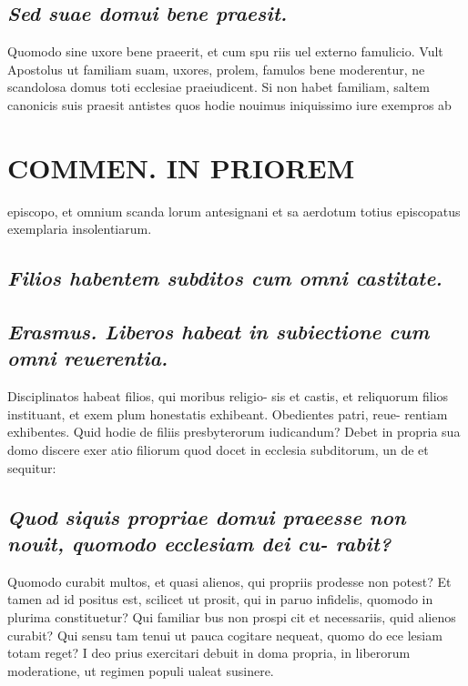\documentclass{article}
\begin{document}
\begin{pages}
\subsection*{\textit{Sed suae domui bene praesit. }}\pstart Quomodo sine uxore bene praeerit, et cum spu riis uel externo famulicio. Vult Apostolus ut familiam suam, uxores, prolem, famulos bene moderentur, ne scandolosa domus toti ecclesiae praeiudicent. Si non habet familiam, saltem canonicis suis praesit antistes quos hodie nouimus iniquissimo iure exempros ab  \pend
\section*{COMMEN. IN PRIOREM }
\marginpar{[ p.78 ]}\pstart episcopo, et omnium scanda lorum antesignani et sa aerdotum totius episcopatus exemplaria insolentiarum.  \pend
{}
{}
\subsection*{\textit{Filios habentem subditos cum omni castitate. }}
{}
\subsection*{\textit{Erasmus. Liberos habeat in subiectione cum omni reuerentia. }}\pstart Disciplinatos habeat filios, qui moribus religio- sis et castis, et reliquorum filios instituant, et exem plum honestatis exhibeant. Obedientes patri, reue- rentiam exhibentes. Quid hodie de filiis presbyterorum iudicandum? Debet in propria sua domo discere exer atio filiorum quod docet in ecclesia subditorum, un de et sequitur:  \pend
{}
{}
\subsection*{\textit{Quod siquis propriae domui praeesse non nouit, quomodo ecclesiam dei cu- rabit? }}\pstart Quomodo curabit multos, et quasi alienos, qui propriis prodesse non potest? Et tamen ad id positus est, scilicet ut prosit, qui in paruo infidelis, quomodo in plurima constituetur? Qui familiar bus non prospi cit et necessariis, quid alienos curabit? Qui sensu tam tenui ut pauca cogitare nequeat, quomo do ece lesiam totam reget? I deo prius exercitari debuit in doma propria, in liberorum moderatione, ut regimen populi ualeat susinere.  \pend

\end{pages}
\end{document}
